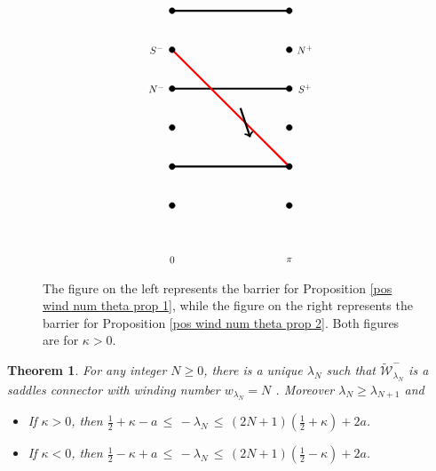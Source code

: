 \documentclass[11 pt]{article}
\newtheorem{thm}{Theorem}[section]
\renewcommand\l{\lambda}
\renewcommand\({\left(}
\renewcommand\){\right)}
\newcommand\wt{\widetilde}
\newcommand\<{\langle}
\renewcommand\>{\rangle}
\renewcommand\l{\lambda}
\newcommand\8{\infty}
\newcommand{\mc}{\mathcal}
\begin{document}
\begin{figure}[h]
\[\begin{tikzpicture}[scale = 0.55]
\draw[ultra thick] (10,-1) -- (16,-1);
\draw[ultra thick] (10,3) -- (16,3);
\draw[ultra thick] (10,7) -- (16,7);


\draw[ultra thick, red] (10,5) -- (16,-1);

\draw[->, ultra thick] (13.5,2) -- (14,0.5);


\node [scale = .50] [circle, draw, fill = black] at (10,-1)  {};
\node [scale = .50] [circle, draw, fill = black] at (10,1)  {};
\node [scale = .50] [circle, draw, fill = black] at (16,-1)  {};
\node [scale = .50] [circle, draw, fill = black] at (16,1)  {};

\node [scale = .50] [circle, draw, fill = black] at (10,7)  {};
\node [scale = .50] [circle, draw, fill = black] at (10,-3)  {};
\node [scale = .50] [circle, draw, fill = black] at (16,7)  {};
\node [scale = .50] [circle, draw, fill = black] at (16,-3)  {};

\node [scale = .50] [circle, draw, fill = black] at (10,3)  {};
\node [scale = .50] [circle, draw, fill = black] at (10,5)  {};
\node [scale = .50] [circle, draw, fill = black] at (16,3)  {};
\node [scale = .50] [circle, draw, fill = black] at (16,5)  {};


\draw (9.2,5) node [scale = .8] {$S^-$};
\draw (9.2,3) node [scale = .8] {$N^-$};
\draw (16.8,5) node [scale = .8] {$N^+$};
\draw (16.8,3) node [scale = .8] {$S^+$};

\draw (10, -5.8) node [scale = .8] {$0$};
\draw (16, -5.8) node [scale = .8] {$\pi$};

\end{tikzpicture}
\]
\captionsetup{format=hang}
\caption{\small{The figure on the left represents the barrier for Proposition \ref{pos wind num theta prop 1}, while the figure on the right represents the barrier for Proposition \ref{pos wind num theta prop 2}. Both figures are for $\kappa > 0$.  }} 
\end{figure}



\medskip
\medskip




\begin{thm}\label{exist theta system saddle connectors thm}
For any integer $N \geq 0$, there is a unique $\l_N$ such that $\wt{\mc{W}}^-_{\l_N}$ is a saddles connector with winding number $w_{\l_N} = N$ . Moreover $\l_N \geq \l_{N+1}$ and
\begin{itemize}
\item[$\bullet$] If $\kappa > 0$, then $\frac{1}{2} + \kappa - a \,\leq\, -\l_N \,\leq\, (2N + 1)\left(\frac{1}{2}+\kappa\right) + 2a$.
\item[$\bullet$] If $\kappa < 0$, then $\frac{1}{2} - \kappa + a \,\leq\, -\l_N \,\leq \,(2N + 1)\left(\frac{1}{2}-\kappa\right) + 2a$.
\end{itemize}

\end{thm}
\end{document}
